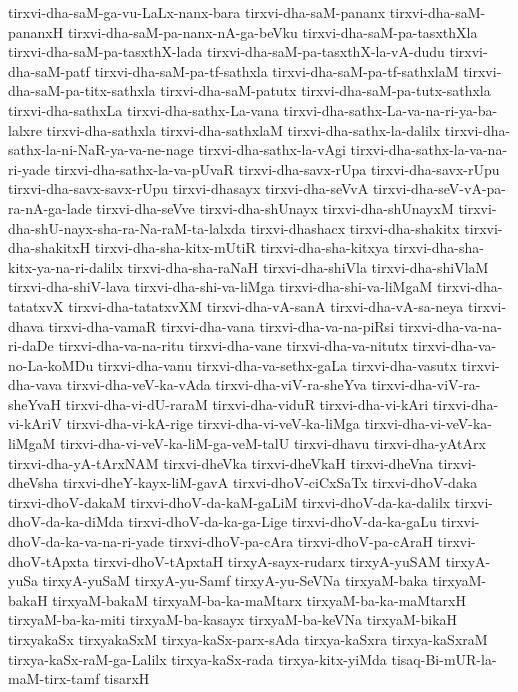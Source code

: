 {tirxvi-dha-saM-ga-vu-LaLx-nanx-bara
tirxvi-dha-saM-pananx
tirxvi-dha-saM-pananxH
tirxvi-dha-saM-pa-nanx-nA-ga-beVku
tirxvi-dha-saM-pa-tasxthXla
tirxvi-dha-saM-pa-tasxthX-lada
tirxvi-dha-saM-pa-tasxthX-la-vA-dudu
tirxvi-dha-saM-patf
tirxvi-dha-saM-pa-tf-sathxla
tirxvi-dha-saM-pa-tf-sathxlaM
tirxvi-dha-saM-pa-titx-sathxla
tirxvi-dha-saM-patutx
tirxvi-dha-saM-pa-tutx-sathxla
tirxvi-dha-sathxLa
tirxvi-dha-sathx-La-vana
tirxvi-dha-sathx-La-va-na-ri-ya-ba-lalxre
tirxvi-dha-sathxla
tirxvi-dha-sathxlaM
tirxvi-dha-sathx-la-dalilx
tirxvi-dha-sathx-la-ni-NaR-ya-va-ne-nage
tirxvi-dha-sathx-la-vAgi
tirxvi-dha-sathx-la-va-na-ri-yade
tirxvi-dha-sathx-la-va-pUvaR
tirxvi-dha-savx-rUpa
tirxvi-dha-savx-rUpu
tirxvi-dha-savx-savx-rUpu
tirxvi-dhasayx
tirxvi-dha-seVvA
tirxvi-dha-seV-vA-pa-ra-nA-ga-lade
tirxvi-dha-seVve
tirxvi-dha-shUnayx
tirxvi-dha-shUnayxM
tirxvi-dha-shU-nayx-sha-ra-Na-raM-ta-lalxda
tirxvi-dhashacx
tirxvi-dha-shakitx
tirxvi-dha-shakitxH
tirxvi-dha-sha-kitx-mUtiR
tirxvi-dha-sha-kitxya
tirxvi-dha-sha-kitx-ya-na-ri-dalilx
tirxvi-dha-sha-raNaH
tirxvi-dha-shiVla
tirxvi-dha-shiVlaM
tirxvi-dha-shiV-lava
tirxvi-dha-shi-va-liMga
tirxvi-dha-shi-va-liMgaM
tirxvi-dha-tatatxvX
tirxvi-dha-tatatxvXM
tirxvi-dha-vA-sanA
tirxvi-dha-vA-sa-neya
tirxvi-dhava
tirxvi-dha-vamaR
tirxvi-dha-vana
tirxvi-dha-va-na-piRsi
tirxvi-dha-va-na-ri-daDe
tirxvi-dha-va-na-ritu
tirxvi-dha-vane
tirxvi-dha-va-nitutx
tirxvi-dha-va-no-La-koMDu
tirxvi-dha-vanu
tirxvi-dha-va-sethx-gaLa
tirxvi-dha-vasutx
tirxvi-dha-vava
tirxvi-dha-veV-ka-vAda
tirxvi-dha-viV-ra-sheYva
tirxvi-dha-viV-ra-sheYvaH
tirxvi-dha-vi-dU-raraM
tirxvi-dha-viduR
tirxvi-dha-vi-kAri
tirxvi-dha-vi-kAriV
tirxvi-dha-vi-kA-rige
tirxvi-dha-vi-veV-ka-liMga
tirxvi-dha-vi-veV-ka-liMgaM
tirxvi-dha-vi-veV-ka-liM-ga-veM-talU
tirxvi-dhavu
tirxvi-dha-yAtArx
tirxvi-dha-yA-tArxNAM
tirxvi-dheVka
tirxvi-dheVkaH
tirxvi-dheVna
tirxvi-dheVsha
tirxvi-dheY-kayx-liM-gavA
tirxvi-dhoV-ciCxSaTx
tirxvi-dhoV-daka
tirxvi-dhoV-dakaM
tirxvi-dhoV-da-kaM-gaLiM
tirxvi-dhoV-da-ka-dalilx
tirxvi-dhoV-da-ka-diMda
tirxvi-dhoV-da-ka-ga-Lige
tirxvi-dhoV-da-ka-gaLu
tirxvi-dhoV-da-ka-va-na-ri-yade
tirxvi-dhoV-pa-cAra
tirxvi-dhoV-pa-cAraH
tirxvi-dhoV-tApxta
tirxvi-dhoV-tApxtaH
tirxyA-sayx-rudarx
tirxyA-yuSAM
tirxyA-yuSa
tirxyA-yuSaM
tirxyA-yu-Samf
tirxyA-yu-SeVNa
tirxyaM-baka
tirxyaM-bakaH
tirxyaM-bakaM
tirxyaM-ba-ka-maMtarx
tirxyaM-ba-ka-maMtarxH
tirxyaM-ba-ka-miti
tirxyaM-ba-kasayx
tirxyaM-ba-keVNa
tirxyaM-bikaH
tirxyakaSx
tirxyakaSxM
tirxya-kaSx-parx-sAda
tirxya-kaSxra
tirxya-kaSxraM
tirxya-kaSx-raM-ga-Lalilx
tirxya-kaSx-rada
tirxya-kitx-yiMda
tisaq-Bi-mUR-la-maM-tirx-tamf
tisarxH
}
